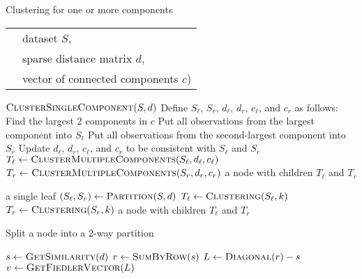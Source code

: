 \documentclass[11pt]{article}
\begin{document}
\begin{algorithm}
\caption{Clustering for one or more components}
\begin{algorithmic}
  \State
    \begin{tabular}{ll}
    \hspace{4em}
    & dataset $S$, \\
    & sparse distance matrix $d$, \\
    & vector of connected components $c$)
    \end{tabular}
    \State \Return $\Call{ClusterSingleComponent}{S, d}$
  \Else
    \State Define $S_\ell$, $S_r$, $d_\ell$, $d_r$, $c_\ell$, and $c_r$ as follows:
    \State Find the largest 2 components in $c$
    \State Put all observations from the largest component into $S_\ell$
    \State Put all observations from the second-largest component into $S_r$
      \State {}
    \EndFor
    \State Update $d_\ell$, $d_r$, $c_\ell$, and $c_r$ to be consistent with $S_\ell$ and $S_r$
    \State $T_\ell \gets \Call{ClusterMultipleComponents}{S_\ell, d_\ell, c_\ell}$
    \State $T_r \gets \Call{ClusterMultipleComponents}{S_r, d_r, c_r}$
    \State \Return a node with children $T_\ell$ and $T_r$
  \EndIf
\EndFunction

\vspace{1em}
    \State \Return a single leaf
  \Else
    \State $(S_\ell, S_r) \gets \Call{Partition}{S, d}$
    \State $T_\ell \gets \Call{Clustering}{S_\ell, k}$
    \State $T_r \gets \Call{Clustering}{S_r, k}$
    \State \Return a node with children $T_\ell$ and $T_r$
  \EndIf
\EndFunction
\end{algorithmic}
\end{algorithm}

\begin{algorithm}
\caption{Split a node into a 2-way partition}
\begin{algorithmic}
    \State {}
  \Else
    \State $s \gets \Call{GetSimilarity}{d}$
    \State $r \gets \Call{SumByRow}{s}$
    \State $L \gets \Call{Diagonal}{r} - s$
    \State $v \gets \Call{GetFiedlerVector}{L}$
    \State {} 
  \EndIf
\EndFunction
\end{algorithmic}
\end{algorithm}
\end{document}
